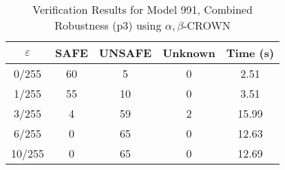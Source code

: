 \begin{table}[htbp]
\centering
\caption{Verification Results for Model 991, Combined Robustness (p3) using $\alpha,\beta$-CROWN}
\label{tab:model991_p3_abcrown}
\begin{tabular}{|c|c|c|c|c|}
\hline
$\varepsilon$ & SAFE & UNSAFE & Unknown & Time (s) \\ \hline
0/255 & 60 & 5 & 0 & 2.51 \\ \hline
1/255 & 55 & 10 & 0 & 3.51 \\ \hline
3/255 & 4 & 59 & 2 & 15.99 \\ \hline
6/255 & 0 & 65 & 0 & 12.63 \\ \hline
10/255 & 0 & 65 & 0 & 12.69 \\ \hline
\end{tabular}
\end{table}
